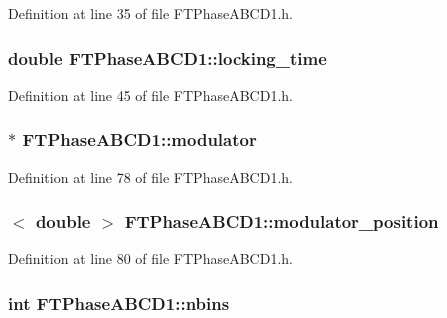 Definition at line 35 of file FTPhaseABCD1.h.

\hypertarget{classFTPhaseABCD1_a622d98f54b96a5690a0f6b26cdf3bc78}{
\subsubsection[{locking\_\-time}]{\setlength{\rightskip}{0pt plus 5cm}double {\bf FTPhaseABCD1::locking\_\-time}}}
\label{classFTPhaseABCD1_a622d98f54b96a5690a0f6b26cdf3bc78}


Definition at line 45 of file FTPhaseABCD1.h.

\hypertarget{classFTPhaseABCD1_adc5fbcfc33764d9ccf0ab886e2d1899c}{
\subsubsection[{modulator}]{$\ast$ {\bf FTPhaseABCD1::modulator}}}
\label{classFTPhaseABCD1_adc5fbcfc33764d9ccf0ab886e2d1899c}


Definition at line 78 of file FTPhaseABCD1.h.

\hypertarget{classFTPhaseABCD1_ab5f6042aa8eee4a574fbfd72279f81ca}{
\subsubsection[{modulator\_\-position}]{$<$ double $>$ {\bf FTPhaseABCD1::modulator\_\-position}}}
\label{classFTPhaseABCD1_ab5f6042aa8eee4a574fbfd72279f81ca}


Definition at line 80 of file FTPhaseABCD1.h.

\hypertarget{classFTPhaseABCD1_a6346350122f18739641a583fa6bb6480}{
\subsubsection[{nbins}]{\setlength{\rightskip}{0pt plus 5cm}int {\bf FTPhaseABCD1::nbins}}}
\label{classFTPhaseABCD1_a6346350122f18739641a583fa6bb6480}



